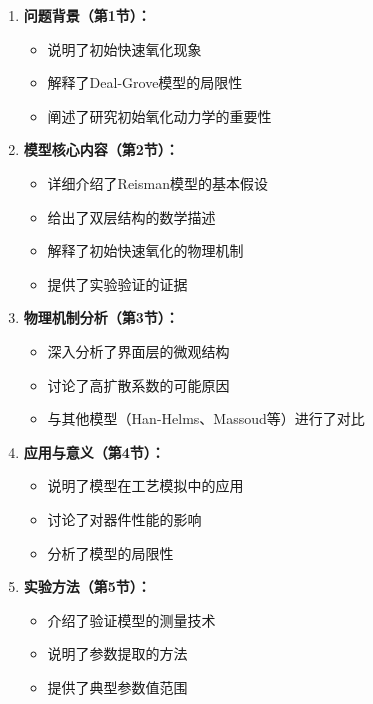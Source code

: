 \documentclass[UTF8,12pt,a4paper]{ctexart}
\begin{document}
\begin{enumerate}
    \item \textbf{问题背景（第1节）：}
    \begin{itemize}
        \item 说明了初始快速氧化现象
        \item 解释了Deal-Grove模型的局限性
        \item 阐述了研究初始氧化动力学的重要性
    \end{itemize}
    
    \item \textbf{模型核心内容（第2节）：}
    \begin{itemize}
        \item 详细介绍了Reisman模型的基本假设
        \item 给出了双层结构的数学描述
        \item 解释了初始快速氧化的物理机制
        \item 提供了实验验证的证据
    \end{itemize}
    
    \item \textbf{物理机制分析（第3节）：}
    \begin{itemize}
        \item 深入分析了界面层的微观结构
        \item 讨论了高扩散系数的可能原因
        \item 与其他模型（Han-Helms、Massoud等）进行了对比
    \end{itemize}
    
    \item \textbf{应用与意义（第4节）：}
    \begin{itemize}
        \item 说明了模型在工艺模拟中的应用
        \item 讨论了对器件性能的影响
        \item 分析了模型的局限性
    \end{itemize}
    
    \item \textbf{实验方法（第5节）：}
    \begin{itemize}
        \item 介绍了验证模型的测量技术
        \item 说明了参数提取的方法
        \item 提供了典型参数值范围
    \end{itemize}
\end{enumerate}
\end{document}
